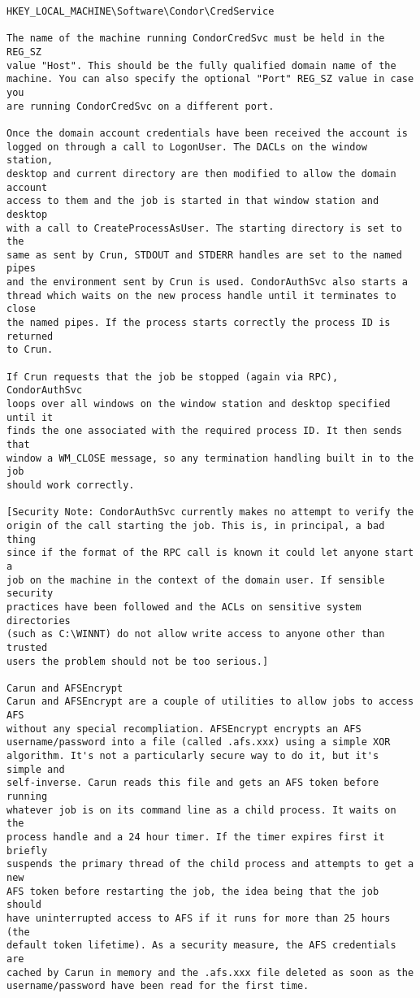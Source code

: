\begin{verbatim}
HKEY_LOCAL_MACHINE\Software\Condor\CredService

The name of the machine running CondorCredSvc must be held in the REG_SZ 
value "Host". This should be the fully qualified domain name of the 
machine. You can also specify the optional "Port" REG_SZ value in case you 
are running CondorCredSvc on a different port.

Once the domain account credentials have been received the account is 
logged on through a call to LogonUser. The DACLs on the window station, 
desktop and current directory are then modified to allow the domain account 
access to them and the job is started in that window station and desktop 
with a call to CreateProcessAsUser. The starting directory is set to the 
same as sent by Crun, STDOUT and STDERR handles are set to the named pipes 
and the environment sent by Crun is used. CondorAuthSvc also starts a 
thread which waits on the new process handle until it terminates to close 
the named pipes. If the process starts correctly the process ID is returned 
to Crun.

If Crun requests that the job be stopped (again via RPC), CondorAuthSvc 
loops over all windows on the window station and desktop specified until it 
finds the one associated with the required process ID. It then sends that 
window a WM_CLOSE message, so any termination handling built in to the job 
should work correctly.

[Security Note: CondorAuthSvc currently makes no attempt to verify the 
origin of the call starting the job. This is, in principal, a bad thing 
since if the format of the RPC call is known it could let anyone start a 
job on the machine in the context of the domain user. If sensible security 
practices have been followed and the ACLs on sensitive system directories 
(such as C:\WINNT) do not allow write access to anyone other than trusted 
users the problem should not be too serious.]

Carun and AFSEncrypt
Carun and AFSEncrypt are a couple of utilities to allow jobs to access AFS 
without any special recompliation. AFSEncrypt encrypts an AFS 
username/password into a file (called .afs.xxx) using a simple XOR 
algorithm. It's not a particularly secure way to do it, but it's simple and 
self-inverse. Carun reads this file and gets an AFS token before running 
whatever job is on its command line as a child process. It waits on the 
process handle and a 24 hour timer. If the timer expires first it briefly 
suspends the primary thread of the child process and attempts to get a new 
AFS token before restarting the job, the idea being that the job should 
have uninterrupted access to AFS if it runs for more than 25 hours (the 
default token lifetime). As a security measure, the AFS credentials are 
cached by Carun in memory and the .afs.xxx file deleted as soon as the 
username/password have been read for the first time.


\end{verbatim}

